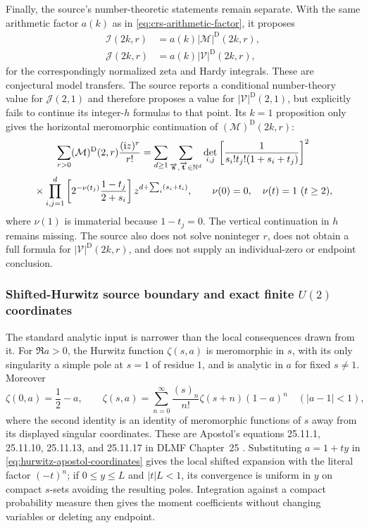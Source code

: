 Finally, the source's number-theoretic statements remain separate.  With the same
arithmetic factor $a(k)$ as in \eqref{eq:crs-arithmetic-factor}, it proposes
\begin{align}
 \mathcal I(2k,r)&=a(k)|\mathcal M|^{\mathrm D}(2k,r),
 \label{eq:dehaye-zeta-moment-proposal}\\
 \mathcal J(2k,r)&=a(k)|\mathcal V|^{\mathrm D}(2k,r),
 \label{eq:dehaye-hardy-moment-proposal}
\end{align}
for the correspondingly normalized zeta and Hardy integrals.  These are conjectural
model transfers.  The source reports a conditional number-theory value for
$\mathcal J(2,1)$ and therefore proposes a value for
$|\mathcal V|^{\mathrm D}(2,1)$, but explicitly fails to continue its integer-$h$
formulas to that point.  Its $k=1$ proposition only gives the horizontal
meromorphic continuation of $(\mathcal M)^{\mathrm D}(2k,r)$:
\begin{multline}
 \sum_{r>0}(\mathcal M)^{\mathrm D}(2,r)\frac{(\mathrm iz)^r}{r!}
 =\sum_{d\geq1}\sum_{{\overrightarrow{\mathbf{s}}},{\overrightarrow{\mathbf{t}}}\in\mathbb N^d}
 \det_{i,j}\left[\frac1{s_i!t_j!(1+s_i+t_j)}\right]^2\\
 {}\times\prod_{i,j=1}^{d}
 \left[2^{-\nu(t_j)}\frac{1-t_j}{2+s_i}\right]
 z^{d+\sum_i(s_i+t_i)},
 \qquad
 \nu(0)=0,\quad \nu(t)=1\ (t\geq2),
 \label{eq:dehaye-k-one-series}
\end{multline}
where $\nu(1)$ is immaterial because $1-t_j=0$.  The vertical continuation in $h$
remains missing.  The source also does not solve noninteger $r$, does not obtain a
full formula for $|\mathcal V|^{\mathrm D}(2k,r)$, and does not supply an
individual-zero or endpoint conclusion.

\subsubsection{Shifted-Hurwitz source boundary and exact finite
\texorpdfstring{$U(2)$}{U(2)} coordinates}

The standard analytic input is narrower than the local consequences drawn from it.  For
$\Re a>0$, the Hurwitz function $\zeta(s,a)$ is meromorphic in $s$, with its only singularity
a simple pole at $s=1$ of residue $1$, and is analytic in $a$ for fixed $s\ne1$.  Moreover
\begin{equation}
 \zeta(0,a)=\frac12-a,
 \qquad
 \zeta(s,a)=\sum_{n=0}^{\infty}
 \frac{(s)_n}{n!}\zeta(s+n)(1-a)^n
 \quad (|a-1|<1),
 \label{eq:hurwitz-apostol-coordinates}
\end{equation}
where the second identity is an identity of meromorphic functions of $s$ away from its
displayed singular coordinates.  These are Apostol's equations 25.11.1, 25.11.10,
25.11.13, and 25.11.17 in DLMF Chapter~25
\cite[\S25.11]{apostolDLMF25}.  Substituting $a=1+ty$ in
\eqref{eq:hurwitz-apostol-coordinates} gives the local shifted expansion with the literal
factor $(-t)^n$; if $0\le y\le L$ and $|t|L<1$, its convergence is uniform in $y$ on compact
$s$-sets avoiding the resulting poles.  Integration against a compact probability measure
then gives the moment coefficients without changing variables or deleting any endpoint.

